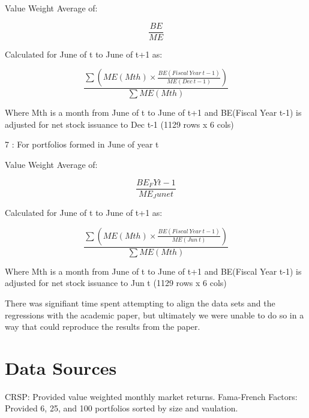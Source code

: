 \documentclass[12pt]{article}
\begin{document}
Value Weight Average of:

\[
\frac{BE}{ME}
\]

Calculated for June of t to June of t+1 as:    

\[
\frac{\sum \left( ME(Mth) \times \frac{BE(Fiscal\ Year\ t-1)}{ME(Dec\ t-1)} \right)}
     {\sum ME(Mth)}
\]

Where Mth is a month from June of t to June of t+1 and BE(Fiscal Year t-1) is adjusted for net stock issuance to Dec t-1 (1129 rows x 6 cols)


7 : For portfolios formed in June of year t   

Value Weight Average of:

\[
\frac{BE_FYt-1}{ME_June t}
\]

Calculated for June of t to June of t+1 as:    

\[
\frac{\sum \left( ME(Mth) \times \frac{BE(Fiscal\ Year\ t-1)}{ME(Jun\ t)} \right)}
     {\sum ME(Mth)}
\]

Where Mth is a month from June of t to June of t+1 and BE(Fiscal Year t-1) is adjusted for net stock issuance to Jun t (1129 rows x 6 cols)



There was signifiant time spent attempting to align the data sets and the regressions with the academic paper, but 
ultimately we were unable to do so in a way that could reproduce the results from the paper.




\doublespacing
\section{Data Sources}

CRSP: Provided value weighted monthly market returns.
Fama-French Factors: Provided 6, 25, and 100 portfolios sorted by size and vaulation.
\end{document}
